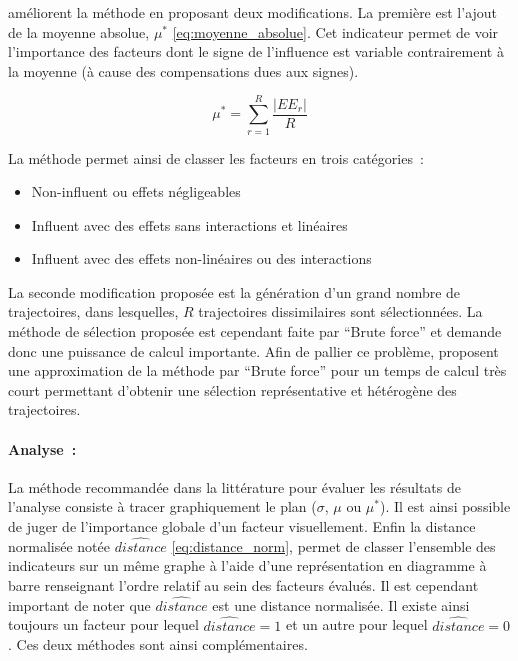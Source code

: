 \textcite{Campolongo20071509} améliorent la méthode en proposant deux modifications. La première
est l’ajout de la moyenne absolue, $\mu^{*}$ \eqref{eq:moyenne_absolue}. Cet indicateur permet
de voir l’importance des facteurs dont le signe de l’influence est variable contrairement à
la moyenne (à cause des compensations dues aux signes).

\begin{equation}\label{eq:moyenne_absolue}
    \mu^{*} = \sum_{r = 1}^{R} \frac{\lvert EE_{r} \rvert}{R}
\end{equation}

\noindent La méthode permet ainsi de classer les facteurs en trois catégories~:
\begin{itemize}
  \item Non-influent ou effets négligeables
  \item Influent avec des effets sans interactions et linéaires
  \item Influent avec des effets non-linéaires ou des interactions
\end{itemize}

La seconde modification proposée est la génération d’un grand nombre de trajectoires,
dans lesquelles, $R$ trajectoires dissimilaires sont sélectionnées. La méthode de sélection
proposée est cependant faite par \enquote{Brute force} et demande donc une puissance de
calcul importante.
Afin de pallier ce problème, \textcite{Ruano2012103} proposent une approximation de
la méthode par \enquote{Brute force} pour un temps de calcul très court permettant d’obtenir
une sélection représentative et hétérogène des trajectoires.

\paragraph{Analyse~:} %
\label{par:analyse}
La méthode recommandée dans la littérature pour évaluer les résultats de l’analyse
consiste à tracer graphiquement le plan ($\sigma$, $\mu$ ou $\mu^{*}$). Il est
ainsi possible de juger de l’importance globale d’un facteur visuellement.
Enfin la distance normalisée notée $\hat{distance}$ \eqref{eq:distance_norm}, permet
de classer l’ensemble des indicateurs sur un même graphe à l’aide d’une représentation
en diagramme à barre renseignant l’ordre relatif au sein des facteurs évalués.
Il est cependant important de noter que $\hat{distance}$ est une distance
normalisée. Il existe ainsi toujours un facteur pour lequel $\hat{distance} = 1$ et un autre
pour lequel $\hat{distance} = 0$. Ces deux méthodes sont ainsi complémentaires.

